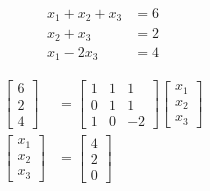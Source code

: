 \begin{align*}
    x_1 + x_2 + x_3 &= 6 \\
    x_2 + x_3 &= 2 \\
    x_1 - 2x_3 &= 4
\end{align*}

\begin{solution}
    \begin{align*}
        \begin{bmatrix}
            6 \\ 2 \\ 4
        \end{bmatrix} &= \begin{bmatrix}
            1 & 1 & 1 \\
            0 & 1 & 1 \\
            1 & 0 & -2
        \end{bmatrix}\begin{bmatrix}
            x_1 \\ x_2 \\ x_3
        \end{bmatrix} \\
        \begin{bmatrix}
            x_1 \\ x_2 \\ x_3
        \end{bmatrix} &= \begin{bmatrix}
            4 \\ 2 \\ 0
        \end{bmatrix}
    \end{align*}
\end{solution}